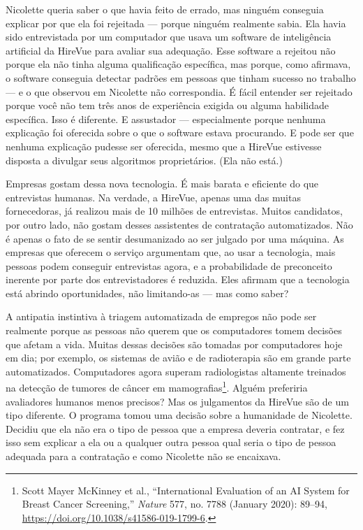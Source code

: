 Nicolette queria saber o que havia feito de errado, mas ninguém conseguia 
explicar por que ela foi rejeitada --- porque ninguém realmente sabia. Ela havia 
sido entrevistada por um computador que usava um software de inteligência 
artificial da HireVue para avaliar sua adequação. Esse software a rejeitou não 
porque ela não tinha alguma qualificação específica, mas porque, como afirmava, 
o software conseguia detectar padrões em pessoas que tinham sucesso no trabalho 
--- e o que observou em Nicolette não correspondia. É fácil entender ser 
rejeitado porque você não tem três anos de experiência exigida ou alguma 
habilidade específica. Isso é diferente. E assustador --- especialmente porque 
nenhuma explicação foi oferecida sobre o que o software estava procurando. E 
pode ser que nenhuma explicação pudesse ser oferecida, mesmo que a HireVue 
estivesse disposta a divulgar seus algoritmos proprietários. (Ela não está.)

Empresas gostam dessa nova tecnologia. É mais barata e eficiente do que 
entrevistas humanas. Na verdade, a HireVue, apenas uma das muitas fornecedoras, 
já realizou mais de 10 milhões de entrevistas. Muitos candidatos, por outro 
lado, não gostam desses assistentes de contratação automatizados. Não é apenas o 
fato de se sentir desumanizado ao ser julgado por uma máquina. As empresas que 
oferecem o serviço argumentam que, ao usar a tecnologia, mais pessoas podem 
conseguir entrevistas agora, e a probabilidade de preconceito inerente por parte 
dos entrevistadores é reduzida. Eles afirmam que a tecnologia está abrindo 
oportunidades, não limitando-as --- mas como saber?

A antipatia instintiva à triagem automatizada de empregos não pode ser realmente 
porque as pessoas não querem que os computadores tomem decisões que afetam a 
vida. Muitas dessas decisões são tomadas por computadores hoje em dia; por 
exemplo, os sistemas de avião e de radioterapia são em grande parte 
automatizados. Computadores agora superam radiologistas altamente treinados na 
detecção de tumores de câncer em mamografias\footnote{Scott Mayer McKinney et
al., ``International Evaluation of an AI System for Breast Cancer Screening,''
\textit{Nature} 577, no. 7788 (January 2020): 89--94, \url{https://doi.org/10.1038/s41586-019-1799-6}.}. Alguém preferiria avaliadores humanos menos precisos? Mas os julgamentos da 
HireVue são de um tipo diferente. O programa tomou uma decisão sobre a 
humanidade de Nicolette. Decidiu que ela não era o tipo de pessoa que a empresa 
deveria contratar, e fez isso sem explicar a ela ou a qualquer outra pessoa qual 
seria o tipo de pessoa adequada para a contratação e como Nicolette não se 
encaixava.

